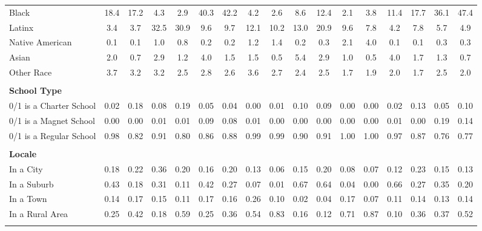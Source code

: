 \begin{tabular*}{\linewidth}{@{\extracolsep{\fill} } lcccccccccccccccc}
\hspace{0.2cm}Black&18.4&17.2&4.3&2.9&40.3&42.2&4.2&2.6&8.6&12.4&2.1&3.8&11.4&17.7&36.1&47.4\\%
\hspace{0.2cm}Latinx&3.4&3.7&32.5&30.9&9.6&9.7&12.1&10.2&13.0&20.9&9.6&7.8&4.2&7.8&5.7&4.9\\%
\hspace{0.2cm}Native American&0.1&0.1&1.0&0.8&0.2&0.2&1.2&1.4&0.2&0.3&2.1&4.0&0.1&0.1&0.3&0.3\\%
\hspace{0.2cm}Asian&2.0&0.7&2.9&1.2&4.0&1.5&1.5&0.5&5.4&2.9&1.0&0.5&4.0&1.7&1.3&0.7\\%
\hspace{0.2cm}Other Race&3.7&3.2&3.2&2.5&2.8&2.6&3.6&2.7&2.4&2.5&1.7&1.9&2.0&1.7&2.5&2.0\\%
&&&&&&&&&&&&&&&&\\%
\multicolumn{17}{l}{\bfseries School Type}\\%
\hspace{0.2cm}0/1 is a Charter School&0.02&0.18&0.08&0.19&0.05&0.04&0.00&0.01&0.10&0.09&0.00&0.00&0.02&0.13&0.05&0.10\\%
\hspace{0.2cm}0/1 is a Magnet School&0.00&0.00&0.01&0.01&0.09&0.08&0.01&0.00&0.00&0.00&0.00&0.00&0.01&0.00&0.19&0.14\\%
\hspace{0.2cm}0/1 is a Regular School&0.98&0.82&0.91&0.80&0.86&0.88&0.99&0.99&0.90&0.91&1.00&1.00&0.97&0.87&0.76&0.77\\%
&&&&&&&&&&&&&&&&\\%
\multicolumn{17}{l}{\bfseries Locale}\\%
\hspace{0.2cm}In a City&0.18&0.22&0.36&0.20&0.16&0.20&0.13&0.06&0.15&0.20&0.08&0.07&0.12&0.23&0.15&0.13\\%
\hspace{0.2cm}In a Suburb&0.43&0.18&0.31&0.11&0.42&0.27&0.07&0.01&0.67&0.64&0.04&0.00&0.66&0.27&0.35&0.20\\%
\hspace{0.2cm}In a Town&0.14&0.17&0.15&0.11&0.17&0.16&0.26&0.10&0.02&0.04&0.17&0.07&0.11&0.14&0.13&0.14\\%
\hspace{0.2cm}In a Rural Area&0.25&0.42&0.18&0.59&0.25&0.36&0.54&0.83&0.16&0.12&0.71&0.87&0.10&0.36&0.37&0.52\\%
&&&&&&&&&&&&&&&&\\%
\hline%
\end{tabular*}